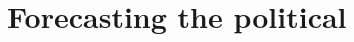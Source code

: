 \documentclass{article}
\begin{document}




\section{Forecasting the political}
\label{sec:forec-polit}
\end{document}
